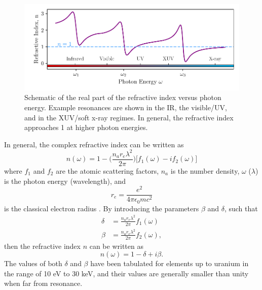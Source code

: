 \begin{figure}
	\centering
	\includegraphics[width=1.0\textwidth]{figures/refractive_index/example_refractive_index.pdf}
	\caption[Schematic of real part of the refractive index from infrared to X-ray wavelengths]{Schematic of the real part of the refractive index versus photon energy. Example resonances are shown in the IR, the visible/UV, and in the XUV/soft x-ray regimes. In general, the refractive index approaches 1 at higher photon energies.}
	\label{fig:refractive_index_schematic}
\end{figure}

In general, the complex refractive index can be written as
\begin{equation}
\label{eqn:refractive_index}
	n(\omega)=1 - \bigg(\frac{n_a r_e \lambda^2}{2\pi}\bigg)\bigg[f_1(\omega) - i f_2(\omega)\bigg]
\end{equation}
where $f_1$ and $f_2$ are the atomic scattering factors, $n_a$ is the number density, $\omega$ ($\lambda$) is the photon energy (wavelength), and
\begin{equation}
\label{eqn:r_e}
	r_e = \frac{e^2}{4\pi\epsilon_0 mc^2}
\end{equation}
is the classical electron radius \cite{attwoodSoftXraysExtreme2000}. By introducing the parameters $\beta$ and $\delta$, such that
\begin{equation}
\label{eqn:delta_beta_def}
	\begin{aligned}
	\delta &= \frac{n_a r_e \lambda^2}{2\pi}f_1(\omega)\\
	\beta & = \frac{n_a r_e \lambda^2}{2\pi}f_2(\omega),
	\end{aligned}
\end{equation}
then the refractive index $n$ can be written as
\begin{equation}
\label{eqn:refractive_index_db}
	n(\omega)=1-\delta+i\beta.
\end{equation}
The values of both $\delta$ and $\beta$ have been tabulated for elements up to uranium in the range of 10 eV to 30 keV\cite{henkeLowenergyXrayInteraction1982}, and their values are generally smaller than unity when far from resonance.

